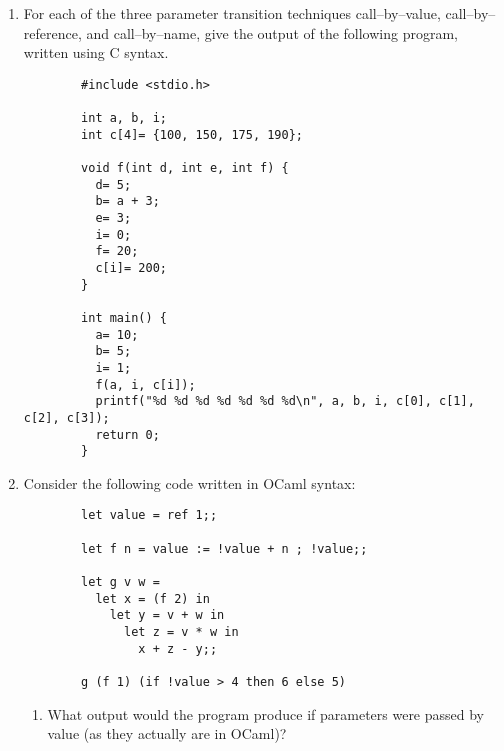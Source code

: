 \documentclass[11pt]{article}
\begin{document}
  \begin{enumerate}

    \addtolength{\itemsep}{4mm}

    \item For each of the three parameter transition techniques
          call--by--value, call--by--reference, and call--by--name, give the
          output of the following program, written using C syntax.

          \vspace{-1.5mm}

          \begin{Verbatim}
        #include <stdio.h>

        int a, b, i;
        int c[4]= {100, 150, 175, 190};

        void f(int d, int e, int f) {
          d= 5;
          b= a + 3;
          e= 3;
          i= 0;
          f= 20;
          c[i]= 200;
        }

        int main() {
          a= 10;
          b= 5;
          i= 1;
          f(a, i, c[i]);
          printf("%d %d %d %d %d %d %d\n", a, b, i, c[0], c[1], c[2], c[3]);
          return 0;
        }
          \end{Verbatim}

          \vspace{-2mm}

    \item Consider the following code written in OCaml syntax:

          \vspace{-1.5mm}

          \begin{Verbatim}
        let value = ref 1;;

        let f n = value := !value + n ; !value;;

        let g v w =
          let x = (f 2) in
            let y = v + w in
              let z = v * w in
                x + z - y;;

        g (f 1) (if !value > 4 then 6 else 5)
          \end{Verbatim}

          \vspace{-2mm}

          \begin{enumerate}

            \addtolength{\itemsep}{1mm}

            \item What output would the program produce if parameters were
                  passed by value (as they actually are in OCaml)?


\end{enumerate}
\end{enumerate}
\end{document}

